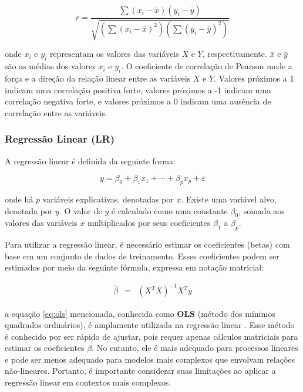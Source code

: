 \begin{equation}
	r=\frac{\sum\left(x_i-\bar{x}\right)\left(y_i-\bar{y}\right)}{\sqrt{\left(\sum\left(x_i-\bar{x}\right)^2\right)\left(\sum\left(y_i-\bar{y}\right)^2\right)}}
\end{equation}

\noindent onde $x_i$ e $y_i$ representam os valores das variáveis $X$ e $Y$, respectivamente. $\bar{x}$ e $\bar{y}$ são as médias dos valores $x_i$ e $y_i$. O coeficiente de correlação de Pearson mede a força e a direção da relação linear entre as variáveis $X$ e $Y$. Valores próximos a 1 indicam uma correlação positiva forte, valores próximos a -1 indicam uma correlação negativa forte, e valores próximos a 0 indicam uma ausência de correlação entre as variáveis.



\subsubsection{Regress\~ao Linear (LR)}

A regressão linear é definida da seguinte forma:

\begin{equation}
	y = \beta_0 + \beta_1 x_1 + \cdots + \beta_p x_p + \varepsilon \label{eq:lr}
\end{equation}

\noindent onde há $p$ variáveis explicativas, denotadas por $x$. Existe uma variável alvo, denotada por $y$. O valor de $y$ é calculado como uma constante $\beta_0$, somada aos valores das variáveis $x$ multiplicados por seus coeficientes $\beta_1$ a $\beta_p$.


Para utilizar a regressão linear, é necessário estimar os coeficientes (betas) com base em um conjunto de dados de treinamento. Esses coeficientes podem ser estimados por meio da seguinte fórmula, expressa em notação matricial:

\begin{eqnarray}
	\hat{\beta}&=&\left(X^T X\right)^{-1} X^T y\label{eq:ols}
\end{eqnarray}

\noindent a equação \eqref{eq:ols} mencionada, conhecida como \textbf{OLS} (método dos mínimos quadrados ordinários), é amplamente utilizada na regressão linear . Esse método é conhecido por ser rápido de ajustar, pois requer apenas cálculos matriciais para estimar os coeficientes $\beta$. No entanto, ele é mais adequado para processos lineares e pode ser menos adequado para modelos mais complexos que envolvam relações não-lineares. Portanto, é importante considerar suas limitações ao aplicar a regressão linear em contextos mais complexos.


